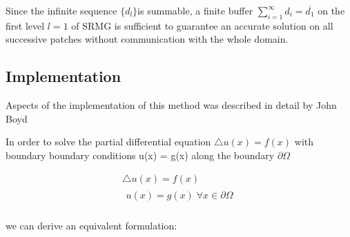 \documentclass[final]{siamart1116}
\numberwithin{theorem}{section}
\begin{document}
Since the infinite sequence $\{d_l\}$is summable, a finite buffer $\sum_{i=1}^\infty d_i = \overline{d_1}$ on the first level $l=1$ of SRMG is sufficient to guarantee an accurate solution on all successive patches without communication with the whole domain. 
            
\subsection{Implementation}

Aspects of the implementation of this method was described in detail by John Boyd \cite{Boyd}


In order to solve the partial differential equation $\bigtriangleup u(x) = f(x)$
with boundary boundary conditions u(x) = g(x) along the boundary $\partial \Omega$

\begin{gather}
  \bigtriangleup u(x) = f(x)\label{pde} \\  
  \begin{split}
    u(x) = g(x)  \; \forall x \in \partial \Omega \nonumber \\
  \end{split}
\end{gather}


we can derive an equivalent formulation:
\end{document}
